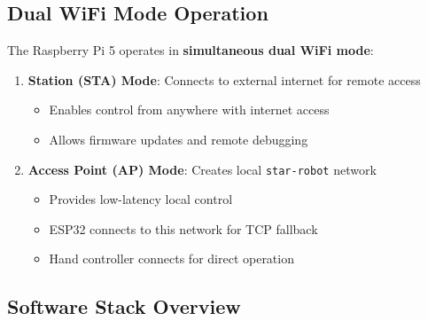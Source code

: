 \subsection{Dual WiFi Mode Operation}

The Raspberry Pi 5 operates in \textbf{simultaneous dual WiFi mode}:

\begin{enumerate}
    \item \textbf{Station (STA) Mode}: Connects to external internet for remote access
    \begin{itemize}
        \item Enables control from anywhere with internet access
        \item Allows firmware updates and remote debugging
    \end{itemize}

    \item \textbf{Access Point (AP) Mode}: Creates local \texttt{star-robot} network
    \begin{itemize}
        \item Provides low-latency local control
        \item ESP32 connects to this network for TCP fallback
        \item Hand controller connects for direct operation
    \end{itemize}
\end{enumerate}

\subsection{Software Stack Overview}

